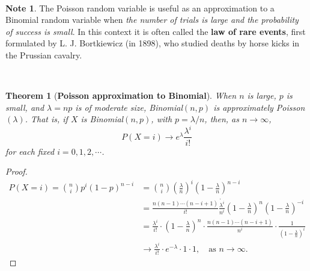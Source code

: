 \documentclass[12pt,a4paper]{article}
\newtheorem{theorem}{Theorem}[section]
\theoremstyle{definition}
\theoremstyle{definition}
\theoremstyle{definition}
\theoremstyle{definition}
\theoremstyle{remark}
\theoremstyle{definition}
\newtheorem*{note}{Note}
\newcommand{\dispsty}{\displaystyle}
\begin{document}
\
\begin{note}
	The Poisson random variable is useful as an approximation to a Binomial random variable when \textit{the number of trials is large and the probability of success is small}. In this context it is often called the \textbf{law of rare events}, first formulated by L. J. Bortkiewicz (in 1898), who studied deaths by horse kicks in the Prussian cavalry.
\end{note}
\
\begin{tcolorbox}[colback=white]
	\begin{theorem}[\bf Poisson approximation to Binomial]
		When $n$ is large, $p$ is small, and $\lambda=np$ is of moderate size, Binomial$(n,p)$ is approximately Poisson$(\lambda)$. That is, if $X$ is Binomial$(n,p)$, with $p=\lambda/n$, then, as $n\to\infty$, \[
		P(X=i)\to e^{\lambda}\frac{\lambda^i}{i!}
		\] for each fixed $i=0,1,2,\cdots$.
	\end{theorem}\tcblower\begin{proof}
	\begin{align*}
	P(X=i)=\binom{n}{i}p^i(1-p)^{n-i}&=\binom{n}{i}\left(\frac{\lambda}{n}\right)^i\left(1-\frac{\lambda}{n}\right)^{n-i}\\
	&=\frac{n(n-1)\cdots(n-i+1)}{i!}\dot{\frac{\lambda^i}{n^i}}\left(1-\frac{\lambda}{n}\right)^n\left(1-\frac{\lambda}{n}\right)^{-i}\\
	&=\frac{\lambda^i}{i!}\cdot\left(1-\frac{\lambda}{n}\right)^n\cdot\frac{n(n-1)\cdots(n-i+1)}{n^i}\cdot\frac{1}{\dispsty\left(1-\frac{\lambda}{n}\right)^i}\\
	&\to\frac{\lambda^i}{i!}\cdot e^{-\lambda}\cdot 1\cdot1, \quad\text{as $n\to\infty$}.
	\end{align*}
\end{proof}
\end{tcolorbox}
\
\end{document}
